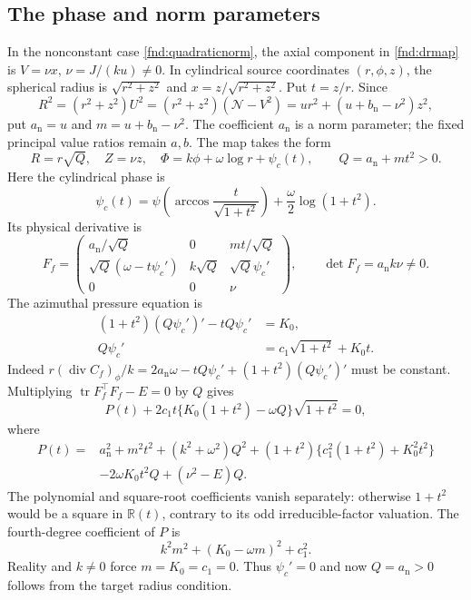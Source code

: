 \documentclass[11pt,a4paper]{article}
\numberwithin{equation}{section}
\theoremstyle{plain}
\theoremstyle{definition}
\theoremstyle{remark}
\begin{document}
\subsection{The phase and norm parameters}\label{appn:phaseproof}
In the nonconstant case \eqref{fnd:quadraticnorm}, the axial component in \eqref{fnd:drmap} is $V=\nu x$, $\nu=J/(ku)\ne0$. In cylindrical source coordinates $(r,\phi,z)$, the spherical radius is $\sqrt{r^2+z^2}$ and $x=z/\sqrt{r^2+z^2}$. Put $t=z/r$. Since
\[
R^2=(r^2+z^2)U^2=(r^2+z^2)(\mathcal N-V^2)
=u r^2+(u+b_{\mathrm n}-\nu^2)z^2,
\]
put $a_{\mathrm n}=u$ and $m=u+b_{\mathrm n}-\nu^2$. The coefficient $a_{\mathrm n}$ is a norm parameter; the fixed principal value ratios remain $a,b$. The map takes the form
\[
R=r\sqrt Q,\quad Z=\nu z,\quad
\Phi=k\phi+\omega\log r+\psi_c(t),\qquad Q=a_{\mathrm n}+mt^2>0.
\]
Here the cylindrical phase is
\[
 \psi_c(t)=\psi\!\left(\arccos\frac{t}{\sqrt{1+t^2}}\right)
                +\frac{\omega}{2}\log(1+t^2).
\]
Its physical derivative is
\[
F_f=\begin{pmatrix}
a_{\mathrm n}/\sqrt Q&0&mt/\sqrt Q\\
\sqrt Q(\omega-t\psi_c')&k\sqrt Q&\sqrt Q \psi_c'\\
0&0&\nu
\end{pmatrix},\qquad \det F_f=a_{\mathrm n}k\nu\ne0.
\]
The azimuthal pressure equation is
\[
\begin{aligned}
 (1+t^2)(Q\psi_c')'-tQ\psi_c'&=K_0,\\
 Q\psi_c'&=c_1\sqrt{1+t^2}+K_0t.
\end{aligned}
\]
Indeed $r(\operatorname{div}C_f)_\phi/k=2a_{\mathrm n}\omega-tQ\psi_c'+(1+t^2)(Q\psi_c')'$ must be constant. Multiplying $\operatorname{tr}F_f^{\top}F_f-E=0$ by $Q$ gives
\begin{equation}\label{fnd:phasepoly}
P(t)+2c_1t\{K_0(1+t^2)-\omega Q\}\sqrt{1+t^2}=0,
\end{equation}
where
\[
\begin{aligned}
P(t)={}&a_{\mathrm n}^2+m^2t^2+(k^2+\omega^2)Q^2
+(1+t^2)\{c_1^2(1+t^2)+K_0^2t^2\}\\
&-2\omega K_0t^2Q+(\nu^2-E)Q.
\end{aligned}
\]
The polynomial and square-root coefficients vanish separately: otherwise $1+t^2$ would be a square in $\mathbb R(t)$, contrary to its odd irreducible-factor valuation. The fourth-degree coefficient of $P$ is
\[
k^2m^2+(K_0-\omega m)^2+c_1^2.
\]
Reality and $k\ne0$ force $m=K_0=c_1=0$. Thus $\psi_c'=0$ and now $Q=a_{\mathrm n}>0$ follows from the target radius condition.
\end{document}
